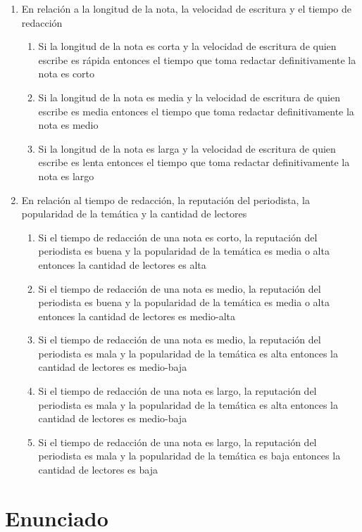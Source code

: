 \documentclass{article}
\begin{document}
\begin{enumerate}
	\item En relación a la longitud de la nota, la velocidad de escritura y el tiempo de redacción
		\begin{enumerate}
			\item Si la longitud de la nota es corta y la velocidad de escritura de quien escribe es rápida entonces el tiempo que toma redactar definitivamente la nota es corto
			\item Si la longitud de la nota es media y la velocidad de escritura de quien escribe es media entonces el tiempo que toma redactar definitivamente la nota es medio
			\item Si la longitud de la nota es larga y la velocidad de escritura de quien escribe es lenta entonces el tiempo que toma redactar definitivamente la nota es largo
		\end{enumerate}
	\item En relación al tiempo de redacción, la reputación del periodista, la popularidad de la temática y la cantidad de lectores
		\begin{enumerate}
			\item Si el tiempo de redacción de una nota es corto, la reputación del periodista es buena y la popularidad de la temática es media o alta entonces la cantidad de lectores es alta
			\item Si el tiempo de redacción de una nota es medio, la reputación del periodista es buena y la popularidad de la temática es media o alta entonces la cantidad de lectores es medio-alta
			\item Si el tiempo de redacción de una nota es medio, la reputación del periodista es mala y la popularidad de la temática es alta entonces la cantidad de lectores es medio-baja
			\item Si el tiempo de redacción de una nota es largo, la reputación del periodista es mala y la popularidad de la temática es alta entonces la cantidad de lectores es medio-baja
			\item Si el tiempo de redacción de una nota es largo, la reputación del periodista es mala y la popularidad de la temática es baja entonces la cantidad de lectores es baja
		\end{enumerate}
\end{enumerate}

\section*{Enunciado}
\end{document}
